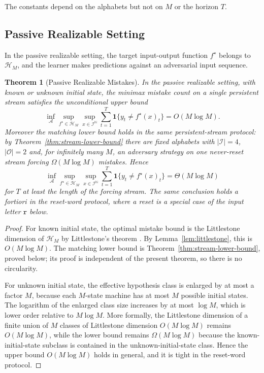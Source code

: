 \documentclass[12pt]{article}
\newtheorem{theorem}{Theorem}[section]
\theoremstyle{definition}
\begin{document}
The constants depend on the alphabets but not on $M$ or the horizon $T$.

\subsection{Passive Realizable Setting}
\label{subsec:passive-realizable}

In the passive realizable setting, the target input-output function
$f^\star$ belongs to $\mathcal H_M$, and the learner makes predictions against
an adversarial input sequence.

\begin{theorem}[Passive Realizable Mistakes]
\label{thm:passive-realizable}
In the passive realizable setting, with known or unknown initial state, the
minimax mistake count on a single persistent stream satisfies the
unconditional upper bound
\[
\inf_{\mathcal A}
\sup_{f^\star\in\mathcal H_M}
\sup_{x\in\mathcal I^{\mathbb N}}
\sum_{t=1}^T
\mathbf 1\{y_t\neq f^\star(x)_t\}
=
O(M\log M).
\]
Moreover the matching lower bound holds in the \emph{same} persistent-stream
protocol: by Theorem~\ref{thm:stream-lower-bound} there are fixed alphabets
with $|\mathcal I|=4$, $|\mathcal O|=2$ and, for infinitely many $M$, an
adversary strategy on one never-reset stream forcing
$\Omega(M\log M)$ mistakes.  Hence
\[
\inf_{\mathcal A}
\sup_{f^\star\in\mathcal H_M}
\sup_{x\in\mathcal I^{\mathbb N}}
\sum_{t=1}^T
\mathbf 1\{y_t\neq f^\star(x)_t\}
=
\Theta(M\log M)
\]
for $T$ at least the length of the forcing stream.  The same conclusion holds
a fortiori in the reset-word protocol, where a reset is a special case of the
input letter $\mathtt r$ below.
\end{theorem}

\begin{proof}
For known initial state, the optimal mistake bound is the Littlestone dimension
of $\mathcal H_M$ by Littlestone's theorem \cite{littlestone1988}.  By
Lemma~\ref{lem:littlestone}, this is $O(M\log M)$.  The matching lower bound
is Theorem~\ref{thm:stream-lower-bound}, proved below; its proof is
independent of the present theorem, so there is no circularity.

For unknown initial state, the effective hypothesis class is enlarged by at
most a factor $M$, because each $M$-state machine has at most $M$ possible
initial states.  The logarithm of the enlarged class size increases by at most
$\log M$, which is lower order relative to $M\log M$.  More formally, the
Littlestone dimension of a finite union of $M$ classes of Littlestone dimension
$O(M\log M)$ remains $O(M\log M)$, while the lower bound remains
$\Omega(M\log M)$ because the known-initial-state subclass is contained in the
unknown-initial-state class.  Hence the upper bound $O(M\log M)$ holds in
general, and it is tight in the reset-word protocol.
\end{proof}
\end{document}
